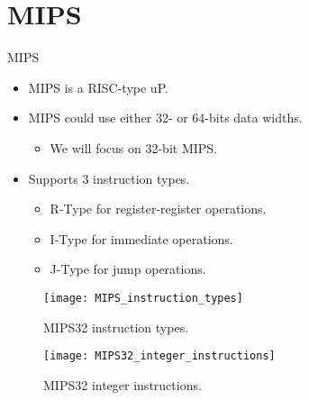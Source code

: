 % 
\section{MIPS}
\begin{frame}{\acs{MIPS}}{}
  \begin{itemize}
  \item \ac{MIPS} is a \ac{RISC}-type \ac{uP}.
  \item \ac{MIPS} could use either 32- or 64-bits data widths.
    \begin{itemize}
	\item We will focus on 32-bit \ac{MIPS}.
	\end{itemize}
  \item Supports 3 instruction types.
    \begin{itemize}
    \item R-Type for register-register operations.
    \item I-Type for immediate operations.
    \item J-Type for jump operations.
    \end{itemize}
  \end{itemize}
\end{frame}

% 
\begin{frame}{}
  \begin{figure}
  \centering
  \texttt{[image: MIPS\_instruction\_types]}
  \caption{\acs{MIPS}32 instruction types.}
  \label{Figure:MIPS32_instruction_types}
  \end{figure}
\end{frame}

% 
\begin{frame}{}
  \begin{figure}
  \centering
  \texttt{[image: MIPS32\_integer\_instructions]}
  \vspace{-8pt}
  \caption{\acs{MIPS}32 integer instructions.}
  \label{Figure:MIPS32_integer_instructions}
  \end{figure}
\end{frame}

